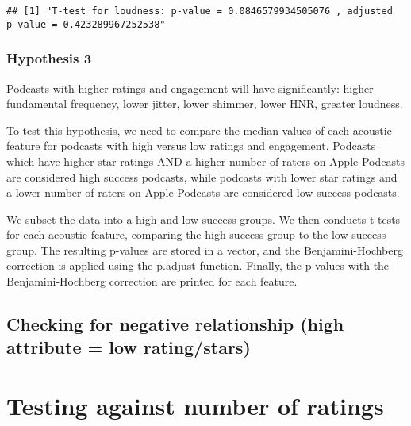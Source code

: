 \documentclass[
]{article}
\newenvironment{Shaded}{\begin{snugshade}}{\end{snugshade}}
\newcommand{\DecValTok}[1]{\textcolor[rgb]{0.00,0.00,0.81}{#1}}
\newcommand{\FunctionTok}[1]{\textcolor[rgb]{0.00,0.00,0.00}{#1}}
\newcommand{\NormalTok}[1]{#1}
\newcommand{\SpecialCharTok}[1]{\textcolor[rgb]{0.00,0.00,0.00}{#1}}
\newcommand{\StringTok}[1]{\textcolor[rgb]{0.31,0.60,0.02}{#1}}
\begin{document}
\begin{Shaded}
\end{Shaded}

\begin{verbatim}
## [1] "T-test for loudness: p-value = 0.0846579934505076 , adjusted p-value = 0.423289967252538"
\end{verbatim}

\hypertarget{hypothesis-3}{%
\subsubsection{Hypothesis 3}\label{hypothesis-3}}

Podcasts with higher ratings and engagement will have significantly:
higher fundamental frequency, lower jitter, lower shimmer, lower HNR,
greater loudness.

To test this hypothesis, we need to compare the median values of each
acoustic feature for podcasts with high versus low ratings and
engagement. Podcasts which have higher star ratings AND a higher number
of raters on Apple Podcasts are considered high success podcasts, while
podcasts with lower star ratings and a lower number of raters on Apple
Podcasts are considered low success podcasts.

We subset the data into a high and low success groups. We then conducts
t-tests for each acoustic feature, comparing the high success group to
the low success group. The resulting p-values are stored in a vector,
and the Benjamini-Hochberg correction is applied using the p.adjust
function. Finally, the p-values with the Benjamini-Hochberg correction
are printed for each feature.

\hypertarget{checking-for-negative-relationship-high-attribute-low-ratingstars}{%
\subsection{Checking for negative relationship (high attribute = low
rating/stars)}\label{checking-for-negative-relationship-high-attribute-low-ratingstars}}

\hypertarget{testing-against-number-of-ratings-1}{%
\section{Testing against number of
ratings}\label{testing-against-number-of-ratings-1}}
\end{document}
